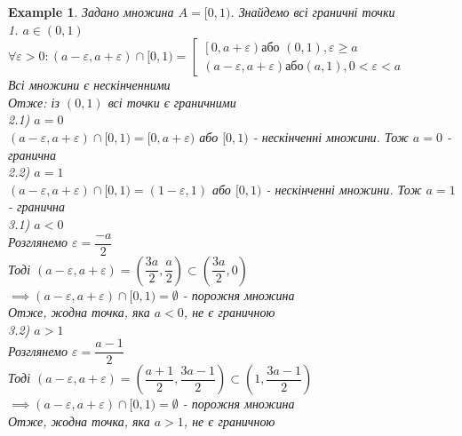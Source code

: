\documentclass[a4paper, 14pt]{extarticle}
\def\bigline{\vspace{5mm}\\}
\theoremstyle{theoremdd}
\theoremstyle{theoremdd}
\theoremstyle{theoremdd}
\theoremstyle{theoremdd}
\newtheorem{example}[theorem]{Example}
\theoremstyle{theoremdd}
\theoremstyle{theoremdd}
\theoremstyle{theoremdd}
\theoremstyle{theoremdd}
\begin{document}
	\begin{example}
	Задано множина $A = [0,1)$. Знайдемо всі граничні точки\\
	1. $a \in (0,1)$\\
	$\forall \varepsilon > 0: (a-\varepsilon,a+\varepsilon) \cap [0,1) = \left[ \begin{gathered} \left[0, a + \varepsilon \right) \textrm{або } (0,1), \varepsilon \geq a \\ \left(a-\varepsilon,a+\varepsilon \right) \textrm{або} \left(a, 1\right), 0 < \varepsilon < a \end{gathered} \right.$\\
	Всі множини є нескінченними\\
Отже: із $(0,1)$ всі точки є граничними
\bigline
	2.1) $a = 0$\\
	$(a-\varepsilon, a+\varepsilon) \cap [0,1) = [0,a+\varepsilon)$ або $[0,1)$ - нескінченні множини. Тож $a = 0$ - гранична\\
	2.2) $a = 1$\\
	$(a-\varepsilon, a+\varepsilon) \cap [0,1) = (1-\varepsilon,1)$ або $[0,1)$ - нескінченні множини. Тож $a = 1$ - гранична
	\bigline
	3.1) $a < 0$\\
	Розглянемо $\varepsilon = \dfrac{-a}{2}$\\
	Тоді $(a-\varepsilon,a+\varepsilon) = \left(\dfrac{3a}{2}, \dfrac{a}{2} \right) \subset \left(\dfrac{3a}{2},0 \right)$\\
	$\implies (a-\varepsilon,a+\varepsilon) \cap [0,1) = \emptyset$ - порожня множина\\
	Отже, жодна точка, яка $a < 0$, не є граничною
	\bigline
	3.2) $a > 1$\\
	Розглянемо $\varepsilon = \dfrac{a-1}{2}$\\
	Тоді $(a-\varepsilon,a+\varepsilon) = \left(\dfrac{a+1}{2}, \dfrac{3a-1}{2} \right) \subset \left(1, \dfrac{3a-1}{2} \right)$\\
	$\implies (a-\varepsilon,a+\varepsilon) \cap [0,1) = \emptyset$ - порожня множина\\
	Отже, жодна точка, яка $a > 1$, не є граничною
	\end{example}
	
\end{document}
